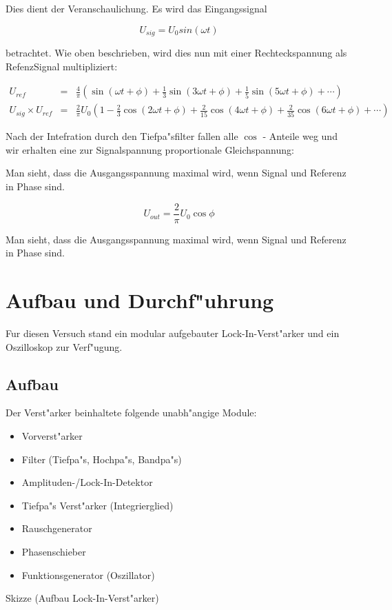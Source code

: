 \documentclass{scrartcl}
\begin{document}
			Dies dient der Veranschaulichung. Es wird das Eingangssignal

			\begin{displaymath}
				U_{sig} = U_0 sin(\omega t)
			\end{displaymath}

			betrachtet. Wie oben beschrieben,
			wird dies nun mit einer Rechteckspannung als RefenzSignal multipliziert:

			\begin{eqnarray*}
				U_{ref} &=& \frac{4}{\pi}
					\left( \sin(\omega t + \phi) + 
						\frac{1}{3} \sin(3 \omega t + \phi) + 
						\frac{1}{5} \sin(5 \omega t + \phi) + 
						\cdots 
					\right)	\\
				U_{sig} \times U_{ref} &=& \frac{2}{\pi} U_0 
				\left(
					1 - 
					\frac{2}{3}\cos(2 \omega t + \phi) + 
					\frac{2}{15} \cos(4 \omega t + \phi) + 
					\frac{2}{35} \cos(6 \omega t + \phi) + 
					\cdots 
				\right)
			\end{eqnarray*}

			Nach der Intefration durch den Tiefpa"sfilter fallen alle $\cos$ - Anteile weg und wir erhalten eine zur Signalspannung proportionale Gleichspannung:


			Man sieht, dass die Ausgangsspannung maximal wird, wenn Signal und Referenz in Phase sind.
		 

			\begin{equation}
				U_{out} = \frac{2}{\pi} U_0 \cos{\phi} \label{theorie}
			\end{equation}


			Man sieht, dass die Ausgangsspannung maximal wird, wenn Signal und Referenz in Phase sind.

	\section{Aufbau und Durchf"uhrung}


		Fur diesen Versuch stand ein modular aufgebauter Lock-In-Verst"arker und ein Oszilloskop zur Verf"ugung.
		
		\subsection{Aufbau}
	
			Der Verst"arker beinhaltete folgende unabh"angige Module:\label{module}
	
			\begin{itemize}
				\item Vorverst"arker
				\item Filter (Tiefpa"s, Hochpa"s, Bandpa"s)
				\item Amplituden-/Lock-In-Detektor
				\item Tiefpa"s Verst"arker (Integrierglied)
				\item Rauschgenerator
				\item Phasenschieber
				\item Funktionsgenerator (Oszillator)
			\end{itemize}
			Skizze (Aufbau Lock-In-Verst"arker)
\end{document}
